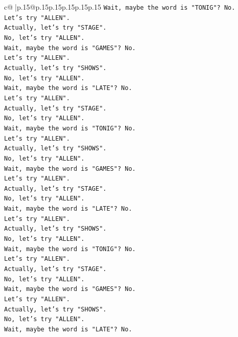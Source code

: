 \documentclass{article}
\begin{document}
{\begin{supertabular}{c@{$\;$}|p{.15\linewidth}@{}p{.15\linewidth}p{.15\linewidth}p{.15\linewidth}p{.15\linewidth}p{.15\linewidth}}
{{{\texttt{Wait, maybe the word is "TONIG"? No.} \\
\texttt{Let's try "ALLEN".} \\
\texttt{Actually, let's try "STAGE".} \\
\texttt{No, let's try "ALLEN".} \\
\texttt{Wait, maybe the word is "GAMES"? No.} \\
\texttt{Let's try "ALLEN".} \\
\texttt{Actually, let's try "SHOWS".} \\
\texttt{No, let's try "ALLEN".} \\
\texttt{Wait, maybe the word is "LATE"? No.} \\
\texttt{Let's try "ALLEN".} \\
\texttt{Actually, let's try "STAGE".} \\
\texttt{No, let's try "ALLEN".} \\
\texttt{Wait, maybe the word is "TONIG"? No.} \\
\texttt{Let's try "ALLEN".} \\
\texttt{Actually, let's try "SHOWS".} \\
\texttt{No, let's try "ALLEN".} \\
\texttt{Wait, maybe the word is "GAMES"? No.} \\
\texttt{Let's try "ALLEN".} \\
\texttt{Actually, let's try "STAGE".} \\
\texttt{No, let's try "ALLEN".} \\
\texttt{Wait, maybe the word is "LATE"? No.} \\
\texttt{Let's try "ALLEN".} \\
\texttt{Actually, let's try "SHOWS".} \\
\texttt{No, let's try "ALLEN".} \\
\texttt{Wait, maybe the word is "TONIG"? No.} \\
\texttt{Let's try "ALLEN".} \\
\texttt{Actually, let's try "STAGE".} \\
\texttt{No, let's try "ALLEN".} \\
\texttt{Wait, maybe the word is "GAMES"? No.} \\
\texttt{Let's try "ALLEN".} \\
\texttt{Actually, let's try "SHOWS".} \\
\texttt{No, let's try "ALLEN".} \\
\texttt{Wait, maybe the word is "LATE"? No.} \\
}}}
\end{supertabular}}
\end{document}
